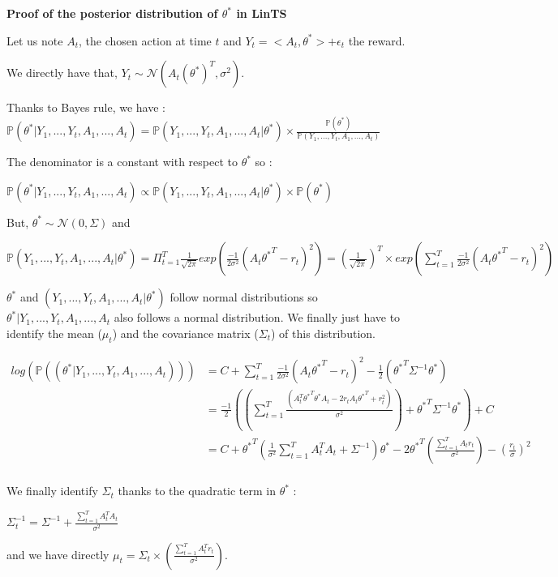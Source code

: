 \textbf{Proof of the posterior distribution of $\theta^*$ in LinTS}


Let us note  $A_t$, the chosen action at time $t$ and $Y_t = < A_t, \theta^*> + \epsilon_t$ the reward. 

We directly have that, $Y_t \sim \mathcal{N}(A_t (\theta^*) ^T, \sigma^2)$. 

Thanks to Bayes rule, we have : \\

$\mathbb{P}(\theta^* | Y_1, ... , Y_t , A_1, ..., A_t) = \mathbb{P}( Y_1, ... , Y_t , A_1, ..., A_t | \theta^* ) \times \frac{\mathbb{P}(\theta^*)}{\mathbb{P}(Y_1, ... , Y_t , A_1, ..., A_t) } $

The denominator is a constant with respect to $\theta^*$ so :

$\mathbb{P}(\theta^* | Y_1, ... , Y_t , A_1, ..., A_t) \propto \mathbb{P}( Y_1, ... , Y_t , A_1, ..., A_t | \theta^* ) \times {\mathbb{P}(\theta^*)}$ 

But, $\theta^* \sim \mathcal{N}(0, \Sigma)$ and

$\mathbb{P}( Y_1, ... , Y_t , A_1, ..., A_t | \theta^* ) = \Pi_{t=1}^{T} \frac{1}{\sqrt{2  \pi}} exp(\frac{-1}{2 \sigma^2} (A_t {\theta^*}^T -r_t)^2) = (\frac{1}{\sqrt{2  \pi}})^T \times exp(\sum_{t=1}^T\frac{-1}{2 \sigma^2} (A_t {\theta^*}^T -r_t)^2) $


$\theta^*$ and $(Y_1, ... , Y_t , A_1, ..., A_t | \theta^*)$ follow normal distributions so  $\theta^* | Y_1, ... , Y_t , A_1, ..., A_t$ also follows a normal distribution.  
We finally just have to identify the mean ($\mu_t$) and the covariance matrix ($\Sigma_t$) of this distribution. 

\begin{align}
    log (\mathbb{P}((  \theta^* |Y_1, ... , Y_t , A_1, ..., A_t ))) &= C + \sum_{t=1}^T\frac{-1}{2 \sigma^2} (A_t {\theta^*}^T -r_t)^2 -\frac{1}{2}({\theta^*}^T \Sigma ^{-1} \theta^*)\\
    & =\frac{-1}{2} ( (\sum_{t=1}^T \frac{(A_t^T {\theta^*}^T \theta^* A_t - 2 r_t A_t{\theta^*}^T + r_t^2)}{\sigma^2}) + {\theta^*}^T \Sigma ^{-1} \theta^*) +C\\
    & = C + {\theta^* }^T(\frac{1}{\sigma^2}\sum_{t=1}^{T} A_t^T A_t + \Sigma^{-1}) \theta^* - 2 {\theta^* }^T(\frac{\sum_{t=1}^T A_t r_t} {\sigma^2}) -(\frac{r_t}{\sigma})^2\\
\end{align}

We finally identify $\Sigma_t$ thanks to the quadratic term in $\theta^*$ :


$\Sigma_t ^{-1} = \Sigma^{-1} + \frac{\sum_{t=1}^{T} A_t^T A_t}{\sigma^2}$ 

and we have directly $\mu_t = \Sigma_t \times (\frac{\sum_{t=1}^{T} A_t^T r_t}{\sigma^2})$. 


